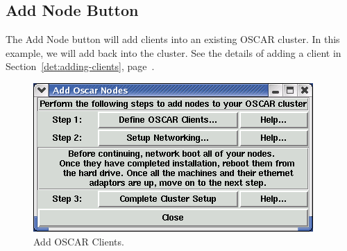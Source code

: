 
\subsection{Add Node Button}
\label{app:sbs-add-node}

The Add Node button will add clients into an existing OSCAR cluster.
In this example, we will add back  into the
cluster.  See the details of adding a client in
Section~\ref{det:adding-clients}, page~\pageref{det:adding-clients}.

\begin{figure}[!ht]
  \begin{center}
    \centerline{\includegraphics[scale=\imgscale]{figs/9a_sbs-add-node}}
    \caption{Add OSCAR Clients.}
    \label{fig:sbs-add-node1}
  \end{center}
\end{figure}

